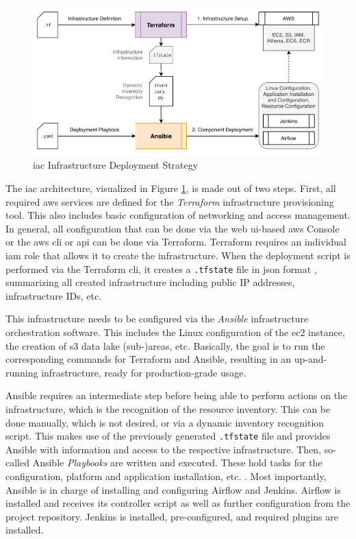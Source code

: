 \begin{figure}
	\centering
	\includegraphics[width=\linewidth]{main-matter/img/5-iac}
	\caption{\acs{iac} Infrastructure Deployment Strategy}
	\label{fig:5-iac}
\end{figure}

The \ac{iac} architecture, visualized in Figure \ref{fig:5-iac}, is made out of two steps. First, all required \ac{aws} services are defined for the \textit{Terraform} infrastructure provisioning tool. This also includes basic configuration of networking and access management. In general, all configuration that can be done via the web \acs{ui}-based \ac{aws} Console or the \ac{aws} \acs{cli} or \acs{api} can be done via Terraform. Terraform requires an individual \ac{iam} role that allows it to create the infrastructure. When the deployment script is performed via the Terraform \acs{cli}, it creates a \texttt{.tfstate} file in \ac{json} format \cite{terraform}, summarizing all created infrastructure including public IP addresses, infrastructure IDs, etc.

This infrastructure needs to be configured via the \textit{Ansible} infrastructure orchestration software. This includes the Linux configuration of the \ac{ec2} instance, the creation of \ac{s3} data lake (sub-)areas, etc. Basically, the goal is to run the corresponding commands for Terraform and Ansible, resulting in an up-and-running infrastructure, ready for production-grade usage.

Ansible requires an intermediate step before being able to perform actions on the infrastructure, which is the recognition of the resource inventory. This can be done manually, which is not desired, or via a dynamic inventory recognition script. This makes use of the previously generated \texttt{.tfstate} file and provides Ansible with information and access to the respective infrastructure. Then, so-called Ansible \textit{Playbooks} are written and executed. These hold tasks for the configuration, platform and application installation, etc. \cite{ansible}. Most importantly, Ansible is in charge of installing and configuring Airflow and Jenkins. Airflow is installed and receives its controller script as well as further configuration from the project repository. Jenkins is installed, pre-configured, and required plugins are installed. 

